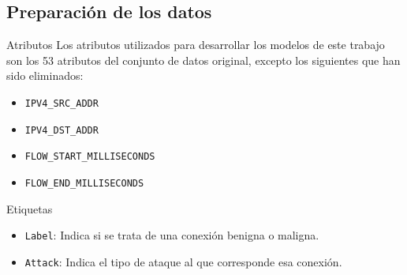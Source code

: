 \subsection{Preparación de los datos}

\begin{frame}{Atributos}
	Los atributos utilizados para desarrollar los modelos de este trabajo son los 53 atributos del conjunto de datos original, excepto los siguientes que han sido eliminados:
	\begin{itemize}
		\item \texttt{IPV4\_SRC\_ADDR}
		\item \texttt{IPV4\_DST\_ADDR}
		\item \texttt{FLOW\_START\_MILLISECONDS}
		\item \texttt{FLOW\_END\_MILLISECONDS}
	\end{itemize}
\end{frame}

\begin{frame}{Etiquetas}
	\begin{itemize}
	
		\item \texttt{Label}: Indica si se trata de una conexión benigna o maligna.
		 \vspace{10mm}
		\item \texttt{Attack}: Indica el tipo de ataque al que corresponde esa conexión.
	\end{itemize}
\end{frame}

